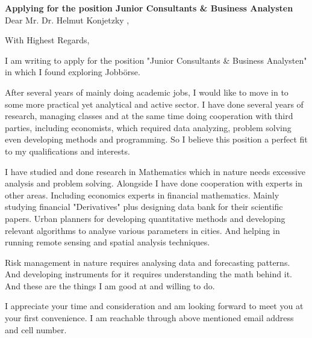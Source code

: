 \documentclass[11pt,a4paper,sans]{moderncv}        %
\title{}                               %
\begin{document}
\date{November 11, 2015}
\opening{\textbf{Applying for the position Junior Consultants \& Business Analysten}\\Dear Mr. Dr. Helmut Konjetzky ,}
\closing{With Highest Regards,}
\makelettertitle
I am writing to apply for the position "Junior Consultants \& Business Analysten" in which I found exploring Jobb\"orse.

After several years of mainly doing academic jobs, I would like to move in to some more practical yet analytical and active sector. I have done several years of research, managing classes and at the same time doing  cooperation with third parties, including economists, which required data analyzing, problem solving even developing methods and programming. So I believe this position a perfect fit to my qualifications and interests.

I have studied and done research in Mathematics which in nature needs excessive analysis and problem solving. Alongside I have done cooperation with experts in other areas. Including economics experts in financial mathematics. Mainly studying financial "Derivatives" plus designing data bank for their scientific papers. Urban planners for developing quantitative methods and developing relevant algorithms to analyse various parameters in cities. And helping in running remote sensing and spatial analysis techniques.

Risk management in nature requires analysing data and forecasting patterns. And developing instruments for it requires understanding the math behind it. And these are the things I am good at and willing to do. 

I appreciate your time and consideration and am looking forward to meet you at your first convenience. I am reachable through above mentioned email address and cell number.
 \vspace{3mm}
 
\makeletterclosing
\end{document}
